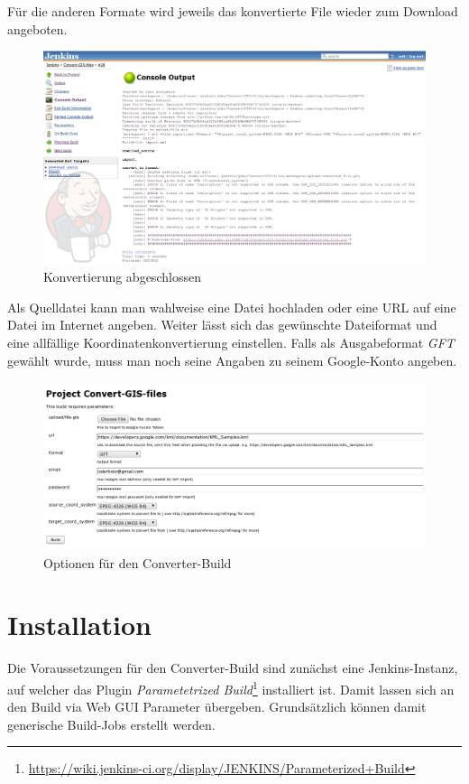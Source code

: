 Für die anderen Formate wird jeweils das konvertierte File wieder zum Download angeboten.

\begin{figure}[!ht]
	\centering
	\includegraphics[width=\textwidth]{images/converter-build/converter-build-done}
	\caption{Konvertierung abgeschlossen}
	\label{converter-build-done}
\end{figure}

Als Quelldatei kann man wahlweise eine Datei hochladen oder eine URL auf eine Datei im Internet angeben. Weiter lässt sich das gewünschte Dateiformat und eine allfällige Koordinatenkonvertierung einstellen. Falls als Ausgabeformat \emph{GFT} gewählt wurde, muss man noch seine Angaben zu seinem Google-Konto angeben.

\begin{figure}[!ht]
	\centering
	\includegraphics[width=\textwidth]{images/converter-build/converter-build-import}
	\caption{Optionen für den Converter-Build}
	\label{converter-build-import}
\end{figure}

\section{Installation}
Die Voraussetzungen für den Converter-Build sind zunächst eine Jenkins-Instanz, auf welcher das Plugin \emph{Parametetrized Build}\footnote{\url{https://wiki.jenkins-ci.org/display/JENKINS/Parameterized+Build}} installiert ist. Damit lassen sich an den Build via Web GUI Parameter übergeben. Grundsätzlich können damit generische Build-Jobs erstellt werden. 

